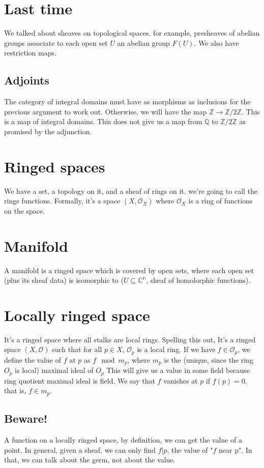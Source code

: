 \documentclass{book}
\renewcommand{\O}{\ensuremath{\mathcal{O}}}
\theoremstyle{definition}
\begin{document}
\section{Last time}
We talked about sheaves on topological spaces. for example, presheaves of abelian
groups associate to each open set $U$ an abelian group  $F(U)$. We also
have restriction maps.

\subsection{Adjoints}
The category of integral domains must have as morphisms as inclusions for
the previous argument to work out. Otherwise, we will have the map
$\mathbb Z \rightarrow \mathbb Z / 2 \mathbb Z$. This is a map of integral domains.
This does not give us a map from $\mathbb Q$ to $\mathbb Z/2\mathbb Z$ as promised
by the adjunction.

\section{Ringed spaces}

We have a set, a topology on it, and a sheaf of rings on it. we're going
to call the rings functions. Formally, it's a space $(X, \O_X)$ where $\O_X$
is a ring of functions on the space.

\section{Manifold}
A manifold is a ringed space which is covered by open sets, where each open
set (plus its sheaf data) is isomorphic to ($U \subseteq \mathbb{C^n}$, sheaf of homolorphic functions).


\section{Locally ringed space}
It's a ringed space where all stalks are local rings. Spelling this out,
It's a ringed space $(X, \O)$ such that for all $p \in X$, $\O_p$ is a local
ring. If we have $f \in \O_p$, we define the value of $f$ at $p$ as $f \mod m_p$,
where $m_p$ is the (unique, since the ring $O_p$ is local) maximal ideal of $O_p$
This will give us a value in some field because ring quotient maximal ideal is 
field. We say that $f$ vanishes at $p$ if $f(p) = 0$. that is, $f \in m_p$. 

\subsection{Beware!}
A function on a locally ringed space, by definition, we can get the value of a 
point. In general, given a sheaf, we can only find $f|p$, the value of "$f$ near p".
In that, we can talk about the germ, not about the value.
\end{document}
